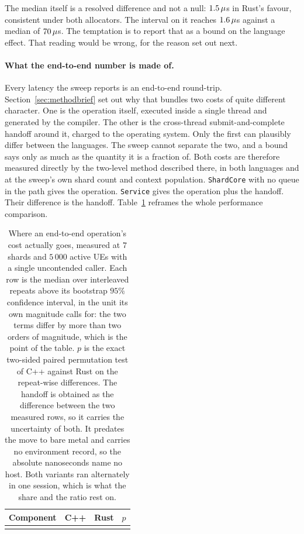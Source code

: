 \documentclass[english,oneside,a4paper,censored,csm,software-track-2020]{HYthesisML}
\begin{document}
The median itself is a resolved difference and not a null: $1.5\,\mu$s
in Rust's favour, consistent under both allocators. The interval on it reaches
$1.6\,\mu$s against a median of $70\,\mu$s. The temptation is to report
that as a bound on the language effect. That reading would be wrong, for the reason set out
next.

\paragraph{What the end-to-end number is made of.}\label{sec:budget}
Every latency the sweep reports is an end-to-end round-trip. Section~\ref{sec:methodbrief} set
out why that bundles two costs of quite different character. One is the operation itself, executed
inside a single thread and generated by the compiler. The other is the cross-thread
submit-and-complete handoff around it, charged to the operating system. Only the first can
plausibly differ between the languages. The sweep cannot separate the two, and a bound says only
as much as the quantity it is a fraction of. Both costs are therefore measured directly by the
two-level method described there, in both languages and at the sweep's own shard count and
context population. \texttt{ShardCore} with no queue in the path gives the operation.
\texttt{Service} gives the operation plus the handoff. Their difference is the handoff.
Table~\ref{tab:budget} reframes the whole performance comparison.

\begin{table}[tp]
\centering
\small
\caption[Where an end-to-end operation's cost actually goes]{Where an end-to-end operation's cost actually goes, measured at $7$ shards and
$5\,000$ active UEs with a single uncontended caller. Each row is the median over
\BudgetRepeats{} interleaved repeats above its bootstrap $95\%$ confidence interval, in the
unit its own magnitude calls for: the two terms differ by more than two orders of magnitude,
which is the point of the table. $p$ is the exact two-sided paired permutation test of C++
against Rust on the repeat-wise differences. The handoff is obtained as the difference between
the two measured rows, so it carries the uncertainty of both. It predates the move to bare metal and
carries no environment record, so the absolute nanoseconds name no host. Both variants ran alternately in
one session, which is what the share and the ratio rest on.\label{tab:budget}}
\begin{tabular}{@{}l r r r@{}}
\hline\hline
Component & C++ & Rust & $p$ \\
\hline
\\
\hline
\end{tabular}
\end{table}
\end{document}
